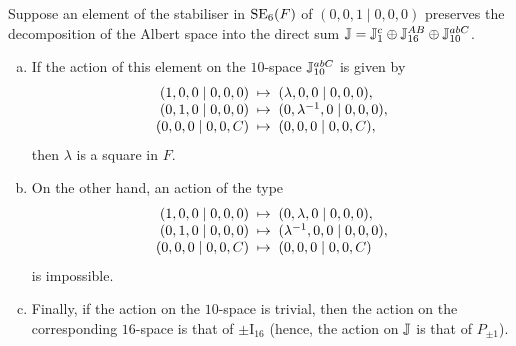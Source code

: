 \begin{lemma}
	\label{lemma:1_2_actions}
	Suppose an element of the stabiliser in $\mathrm{SE}_6(F)$ of $(0,0,1 \mid 0,0,0)$ preserves 
	the decomposition of the Albert space into
	the direct sum \mbox{$\mathbb{J} = \mathbb{J}_{1}^c \oplus \mathbb{J}_{16}^{AB} \oplus \mathbb{J}_{10}^{abC}$}.
	
	\begin{enumerate}[(a)]
	\item If the action of this element on the $10$-space $\mathbb{J}_{10}^{abC}$ 
	is given by
	\begin{equation*}
		\begin{array}{r@{\;\;}c@{\;\;}l}
			(1,0,0\mid 0,0,0) & \mapsto & (\lambda,0,0\mid 0,0,0), \\
			(0,1,0\mid 0,0,0) & \mapsto & (0,\lambda^{-1},0\mid 0,0,0), \\
			(0,0,0\mid 0,0,C) & \mapsto & (0,0,0 \mid 0,0,C),
		\end{array}
	\end{equation*}
	then $\lambda$ is a square in $F$. 
	
	\item On the other hand, an action of the type 
	\begin{equation*}
		\begin{array}{r@{\;\;}c@{\;\;}l}
			(1,0,0\mid 0,0,0) & \mapsto & (0,\lambda,0\mid 0,0,0), \\
			(0,1,0\mid 0,0,0) & \mapsto & (\lambda^{-1},0,0\mid 0,0,0), \\
			(0,0,0\mid 0,0,C) & \mapsto & (0,0,0 \mid 0,0,C)
		\end{array}
	\end{equation*}
	is impossible. 
	
	\item Finally, if the action on the $10$-space is 
	trivial, then the action on the corresponding $16$-space is that of $\pm \mathrm{I}_{16}$ 
	(hence, the action on $\mathbb{J}$ is that of $P_{\pm 1}$). 
	
	\end{enumerate}
\end{lemma}

